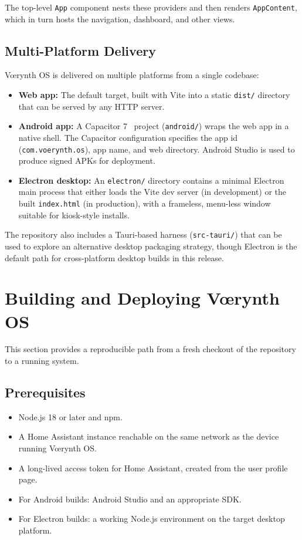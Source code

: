 \documentclass[11pt,a4paper]{article}
\begin{document}
The top-level \texttt{App} component nests these providers and then renders \texttt{AppContent}, which in turn hosts the navigation, dashboard, and other views.

\subsection{Multi-Platform Delivery}

Vœrynth OS is delivered on multiple platforms from a single codebase:
\begin{itemize}[leftmargin=*]
  \item \textbf{Web app:} The default target, built with Vite into a static \texttt{dist/} directory that can be served by any HTTP server.
  \item \textbf{Android app:} A Capacitor 7~\cite{capacitor} project (\texttt{android/}) wraps the web app in a native shell. The Capacitor configuration specifies the app id (\texttt{com.voerynth.os}), app name, and web directory. Android Studio is used to produce signed APKs for deployment.
  \item \textbf{Electron desktop:} An \texttt{electron/} directory contains a minimal Electron main process that either loads the Vite dev server (in development) or the built \texttt{index.html} (in production), with a frameless, menu-less window suitable for kiosk-style installs.
\end{itemize}

The repository also includes a Tauri-based harness (\texttt{src-tauri/}) that can be used to explore an alternative desktop packaging strategy, though Electron is the default path for cross-platform desktop builds in this release.

\section{Building and Deploying Vœrynth OS}

This section provides a reproducible path from a fresh checkout of the repository to a running system.

\subsection{Prerequisites}

\begin{itemize}[leftmargin=*]
  \item Node.js 18 or later and npm.
  \item A Home Assistant instance reachable on the same network as the device running Vœrynth OS.
  \item A long-lived access token for Home Assistant, created from the user profile page.
  \item For Android builds: Android Studio and an appropriate SDK.
  \item For Electron builds: a working Node.js environment on the target desktop platform.
\end{itemize}
\end{document}
